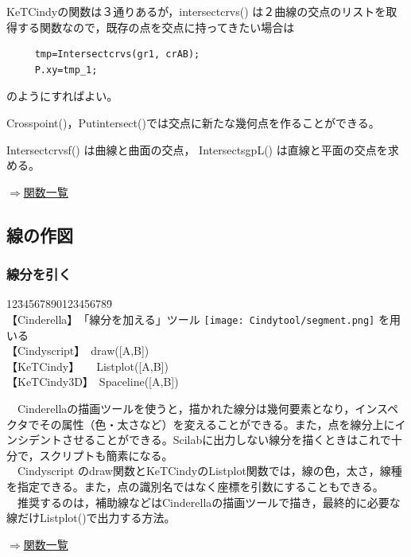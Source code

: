 \documentclass[papersize,a4paper,12pt,uplatex]{jsarticle}
\begin{document}
KeTCindyの関数は３通りあるが，intersectcrvs() は２曲線の交点のリストを取得する関数なので，既存の点を交点に持ってきたい場合は
\begin{verbatim}
　　　tmp=Intersectcrvs(gr1, crAB);
　　　P.xy=tmp_1;
\end{verbatim}
のようにすればよい。

Crosspoint()，Putintersect()では交点に新たな幾何点を作ることができる。

Intersectcrvsf() は曲線と曲面の交点， IntersectsgpL() は直線と平面の交点を求める。

\begin{flushright} \hyperlink{functionlist3d}{$\Rightarrow$関数一覧}\end{flushright}

\subsection{線の作図}
\subsubsection{線分を引く}

\begin{tabbing}
12\=34567890123456789\=\kill\\

\>【Cinderella】　\>「線分を加える」ツール \texttt{[image: Cindytool/segment.png]} を用いる　\\ 
\>【Cindyscript】　\>draw([A,B])　\\
 \>【KeTCindy】　　\>Listplot([A,B])　\\
 \>【KeTCindy3D】　\>Spaceline([A,B])　\\
\end{tabbing}
　Cinderellaの描画ツールを使うと，描かれた線分は幾何要素となり，インスペクタでその属性（色・太さなど）を変えることができる。また，点を線分上にインシデントさせることができる。Scilabに出力しない線分を描くときはこれで十分で，スクリプトも簡素になる。\\
　Cindyscript のdraw関数とKeTCindyのListplot関数では，線の色，太さ，線種を指定できる。また，点の識別名ではなく座標を引数にすることもできる。\\
　推奨するのは，補助線などはCinderellaの描画ツールで描き，最終的に必要な線だけListplot()で出力する方法。\\
\begin{flushright} \hyperlink{functionlist3d}{$\Rightarrow$関数一覧}\end{flushright}
\end{document}
